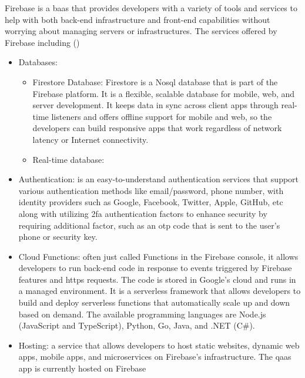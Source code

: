 \begin{multicols}{2}
      Firebase is a \acrshort{baas} that provides developers with a variety of tools and services to help with both
      back-end infrastructure and front-end capabilities without worrying about managing servers or infrastructures.
      The services offered by Firebase including (\cite{firebaseproducts})
      \begin{itemize}
            \item Databases: 
            \begin{itemize}
                  \item Firestore Database: Firestore is a No\acrshort{sql} database that is part of the Firebase 
                  platform. It is a flexible, scalable database for mobile, web, and server development. It keeps 
                  data in sync across client apps through real-time listeners and offers offline support for mobile 
                  and web, so the developers can build responsive apps that work regardless of network latency or 
                  Internet connectivity.
                  \item Real-time database:
            \end{itemize}
            \item Authentication: is an easy-to-understand authentication services that support various authentication
                  methods like email/password, phone number, with identity providers such as Google, Facebook, Twitter,
                  Apple, GitHub, \acrshort{etc}
                  along with utilizing \acrshort{2fa} authentication factors to enhance security by requiring additional
                  factor, such as an \acrshort{otp} code that is sent to the user's phone or security key.
            \item Cloud Functions: often just called Functions in the Firebase console, it allows developers to run 
                  back-end code in response to events triggered by Firebase features and \acrshort{https} requests. 
                  The code is stored in Google's cloud and runs in a managed environment. It is a serverless framework
                  that allows developers to build and deploy serverless functions that automatically scale up and down
                  based on demand. The available programming languages are Node.js (JavaScript and TypeScript), Python, Go, 
                  Java, and .NET (C\#).
            \item Hosting: a service that allows developers to host static websites, dynamic web apps, mobile apps, and 
                  microservices on Firebase's infrastructure. The \acrshort{qaas} app is currently hosted on Firebase 

\end{itemize}
\end{multicols}
